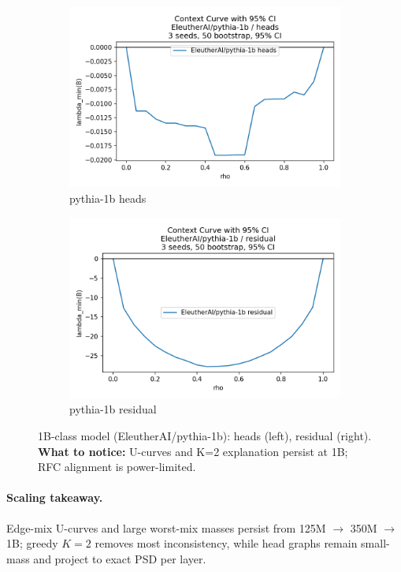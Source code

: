 \documentclass[11pt]{article}
\newcommand{\1}{\mathbf{1}}
\begin{document}
\begin{figure}[t]
\centering
\begin{subfigure}[t]{0.48\textwidth}
\includegraphics[width=\linewidth]{figs/curve_EleutherAI_pythia-1b_heads.png}
\caption{pythia-1b heads}
\end{subfigure}\hfill
\begin{subfigure}[t]{0.48\textwidth}
\includegraphics[width=\linewidth]{figs/curve_EleutherAI_pythia-1b_residual.png}
\caption{pythia-1b residual}
\end{subfigure}
\caption{1B-class model (EleutherAI/pythia-1b): heads (left), residual (right). \textbf{What to notice:} U-curves and K{=}2 explanation persist at 1B; RFC alignment is power-limited.}
\label{fig:curve_big_heads_real}
\end{figure}

\paragraph{Scaling takeaway.} Edge-mix U-curves and large worst-mix masses persist from 125M $\to$ 350M $\to$ 1B; greedy $K{=}2$ removes most inconsistency, while head graphs remain small-mass and project to exact PSD per layer.
\end{document}
